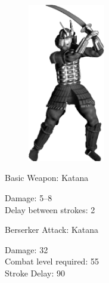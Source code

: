 \begin{figure}
	\begin{center}
		\vspace{-20pt}
		\includegraphics[width=0.3\textwidth]{Ajapanese}
	\end{center}
	\vspace{-20pt}
\end{figure}

Basic Weapon: Katana
\begin{adjustwidth}{1cm}{}
	Damage: 5–8 \\
	Delay between strokes: 2
\end{adjustwidth}
Berserker Attack: Katana
\begin{adjustwidth}{1cm}{}
	Damage: 32 \\
	Combat level required: 55 \\
	Stroke Delay: 90 \\ \\ \\ \\ \\ \\ \\ \\ 
\end{adjustwidth}

